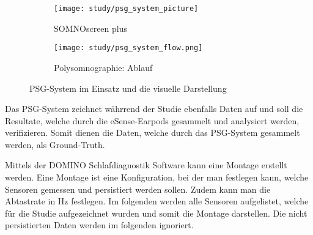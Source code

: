 \begin{figure}[ht]
    \centering
    \begin{subfigure}{.4\textwidth}
        \begin{center}
            \texttt{[image: study/psg\_system\_picture]}
        \end{center}
        \caption{{SOMNOscreen \texttrademark} plus}
    \end{subfigure}
    \begin{subfigure}{.58\textwidth}
        \begin{center}
            \texttt{[image: study/psg\_system\_flow.png]}
        \end{center}
        \caption{Polysomnographie: Ablauf}
    \end{subfigure}
    \caption{PSG-System im Einsatz und die visuelle Darstellung\protect\footnotemark}
    \label{analysis:psg:picture}
  \end{figure}


Das PSG-System zeichnet währrend der Studie ebenfalls Daten auf und soll die Resultate, welche durch die eSense-Earpods gesammelt und analysiert werden, verifizieren. Somit dienen die Daten, welche durch das PSG-System gesammelt werden, als \glqq Ground-Truth\grqq.

Mittels der {\glqq DOMINO Schlafdiagnostik\grqq} Software kann eine Montage erstellt werden. 
Eine Montage ist eine Konfiguration, bei der man festlegen kann, welche Sensoren gemessen und persistiert werden sollen. Zudem kann man die Abtastrate in $\si{\hertz}$ festlegen.
Im folgenden werden alle Sensoren aufgelistet, welche für die Studie aufgezeichnet wurden und somit die Montage darstellen. Die nicht persistierten Daten werden im folgenden ignoriert.

